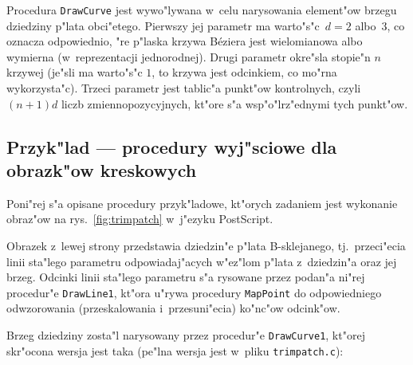 Procedura \texttt{DrawCurve} jest wywo"lywana w~celu narysowania element"ow
brzegu dziedziny p"lata obci"etego. Pierwszy jej parametr ma warto"s"c~$d=2$
albo~$3$, co oznacza odpowiednio, "re p"laska krzywa B\'{e}ziera jest
wielomianowa albo wymierna (w~reprezentacji jednorodnej). Drugi parametr
okre"sla stopie"n $n$ krzywej (je"sli ma warto"s"c $1$, to krzywa jest
odcinkiem, co mo"rna wykorzysta"c). Trzeci parametr jest tablic"a punkt"ow
kontrolnych, czyli $(n+1)d$ liczb zmiennopozycyjnych, kt"ore s"a
wsp"o"lrz"ednymi tych punkt"ow.


\subsection*{Przyk"lad --- procedury wyj"sciowe dla obrazk"ow kreskowych}

Poni"rej s"a opisane procedury przyk"ladowe, kt"orych zadaniem jest
wykonanie obraz"ow na rys.~\ref{fig:trimpatch} w~j"ezyku PostScript.

Obrazek z~lewej strony przedstawia dziedzin"e p"lata B-sklejanego,
tj.\ przeci"ecia \mbox{linii} sta"lego parametru odpowiadaj"acych w"ez"lom
p"lata
z~dziedzin"a oraz jej brzeg. Odcinki linii sta"lego parametru s"a rysowane
przez podan"a ni"rej procedur"e \texttt{DrawLine1}, kt"ora u"rywa procedury
\texttt{MapPoint} do odpowiedniego odwzorowania (przeskalowania
i~przesuni"ecia) ko"nc"ow odcink"ow.

\vspace{\medskipamount}
\vspace{\medskipamount}

Brzeg dziedziny zosta"l narysowany przez procedur"e
\texttt{DrawCurve1}, kt"orej skr"ocona wersja jest taka (pe"lna wersja jest
w~pliku \texttt{trimpatch.c}):

